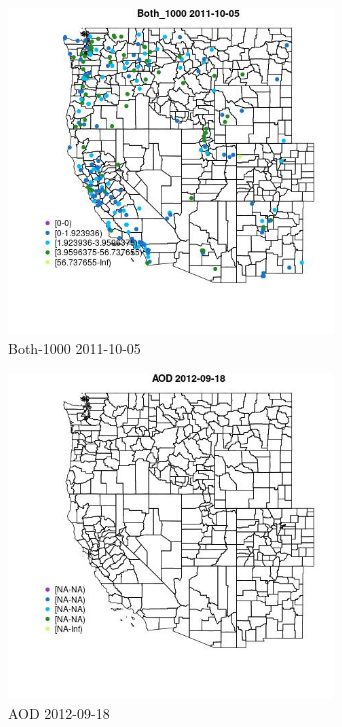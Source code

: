 \begin{figure} 
\centering  
\includegraphics[width=0.77\textwidth]{Code_Outputs/ML_input_report_ML_input_PM25_Step5_part_d_de_duplicated_aves_ML_input_MapObsBoth_10002011-10-05.jpg} 
\caption{\label{fig:ML_input_report_ML_input_PM25_Step5_part_d_de_duplicated_aves_ML_inputMapObsBoth_10002011-10-05}Both-1000 2011-10-05} 
\end{figure} 
 

\begin{figure} 
\centering  
\includegraphics[width=0.77\textwidth]{Code_Outputs/ML_input_report_ML_input_PM25_Step5_part_d_de_duplicated_aves_ML_input_MapObsAOD2012-09-18.jpg} 
\caption{\label{fig:ML_input_report_ML_input_PM25_Step5_part_d_de_duplicated_aves_ML_inputMapObsAOD2012-09-18}AOD 2012-09-18} 
\end{figure} 
 

